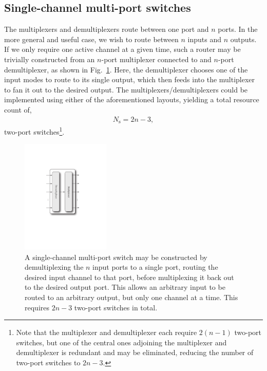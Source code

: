 %
%

\subsection{Single-channel multi-port switches} 

The multiplexers and demultiplexers route between one port and $n$ ports. In the more general and useful case, we wish to route between $n$ inputs and $n$ outputs. If we only require one active channel at a given time, such a router may be trivially constructed from an $n$-port multiplexer connected to and $n$-port demultiplexer, as shown in Fig.~\ref{fig:single_channel_multi_port_switch}. Here, the demultiplexer chooses one of the input modes to route to its single output, which then feeds into the multiplexer to fan it out to the desired output. The multiplexers/demultiplexers could be implemented using either of the aforementioned layouts, yielding a total resource count of,
\begin{align}
	N_\mathrm{s} = 2n-3,
\end{align}
two-port switches\footnote{Note that the multiplexer and demultiplexer each require \mbox{$2(n-1)$} two-port switches, but one of the central ones adjoining the multiplexer and demultiplexer is redundant and may be eliminated, reducing the number of two-port switches to \mbox{$2n-3$}.}.

\begin{figure}[!htbp]
\includegraphics[clip=true, width=0.375\textwidth]{single_channel_multi_port_switch}
\captionspacefig \caption{A single-channel multi-port switch may be constructed by demultiplexing the $n$ input ports to a single port, routing the desired input channel to that port, before multiplexing it back out to the desired output port. This allows an arbitrary input to be routed to an arbitrary output, but only one channel at a time. This requires \mbox{$2n-3$} two-port switches in total.} \label{fig:single_channel_multi_port_switch} 	
\end{figure}

